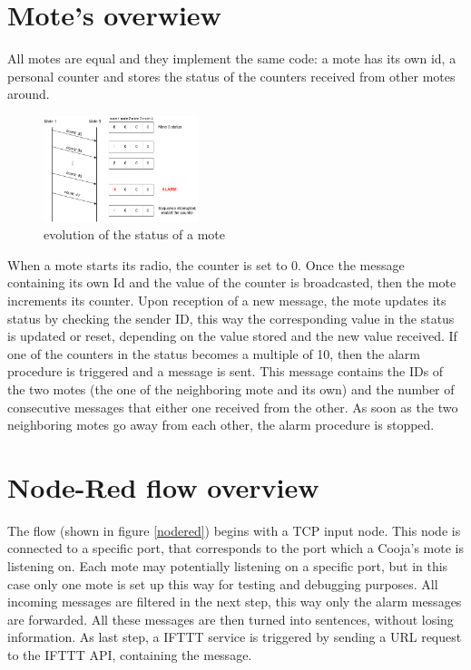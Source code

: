 \documentclass[11pt]{article}
\begin{document}
\section{Mote's overwiew}
All motes are equal and they implement the same code: \newline
a mote has its own id, a personal counter and stores the status of the counters received from other motes around. \newline
\begin{figure}
  \begin{center}
    \includegraphics[width=0.40\textwidth]{status_update_diagram.png}
    \caption{evolution of the status of a mote}
  \end{center}
\end{figure}
When a mote starts its radio, the counter is set to 0. Once the message containing its own Id and the value of the counter is broadcasted, then the mote increments its counter. \newline
Upon reception of a new message, the mote updates its status by checking the sender ID, this way the corresponding value in the status is updated or reset, depending on the value stored and the new value received. \newline
If one of the counters in the status becomes a multiple of 10, then the alarm procedure is triggered and a message is sent. This message contains the IDs of the two motes (the one of the neighboring mote and its own) and the number of consecutive messages that either one received from the other. \newline
As soon as the two neighboring motes go away from each other, the alarm procedure is stopped.

\section{Node-Red flow overview}
The flow (shown in figure \ref{nodered}) begins with a TCP input node. This node is connected to a specific port, that corresponds to the port which a Cooja's mote is listening on. Each mote may potentially listening on a specific port, but in this case only one mote is set up this way for testing and debugging purposes. \newline
All incoming messages are filtered in the next step, this way only the alarm messages are forwarded. All these messages are then turned into sentences, without losing information. \newline
As last step, a IFTTT service is triggered by sending a URL request to the IFTTT API, containing the message.
\end{document}
